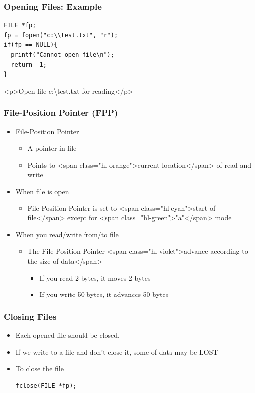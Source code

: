 \documentclass{../c-lecture}
\begin{document}
\begin{frame}[fragile]
  \frametitle{Opening Files: Example}
  \begin{verbatim}
FILE *fp;
fp = fopen("c:\\test.txt", "r");
if(fp == NULL){
  printf("Cannot open file\n");
  return -1;
}
  \end{verbatim}
  <p>Open file c:\textbackslash test.txt for reading</p>
\end{frame}

\begin{frame}
  \frametitle{File-Position Pointer (FPP)}
  \begin{itemize}
    \item File-Position Pointer
    \begin{itemize}
      \item A pointer in file
      \item
        Points to <span class="hl-orange">current location</span> of read and
        write

    \end{itemize}
    \item When file is open
    \begin{itemize}
      \item
        File-Position Pointer is set to
        <span class="hl-cyan">start of file</span> except for
        <span class="hl-green">"a"</span> mode

    \end{itemize}
    \item When you read/write from/to file
    \begin{itemize}
      \item
        The File-Position Pointer
        <span class="hl-violet">advance according to the size of data</span>

      \begin{itemize}
        \item If you read 2 bytes, it moves 2 bytes
        \item If you write 50 bytes, it advances 50 bytes
      \end{itemize}
    \end{itemize}
  \end{itemize}
\end{frame}

\begin{frame}[fragile]
  \frametitle{Closing Files}
  \begin{itemize}
    \item Each opened file should be closed.
    \item If we write to a file and don’t close it, some of data may be LOST
    \item To close the file
    \begin{verbatim}
fclose(FILE *fp);
    \end{verbatim}
  \end{itemize}
\end{frame}
\end{document}
